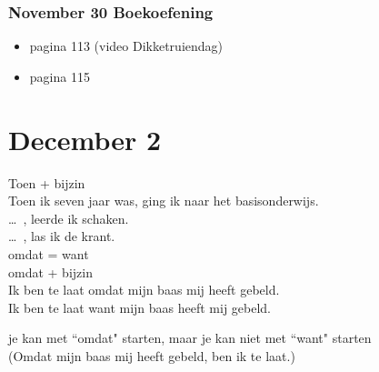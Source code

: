 \documentclass[usenames,dvipsnames]{beamer}
\begin{document}
	\begin{frame}
		\frametitle{November 30 Boekoefening}

		\begin{itemize}
			\item pagina 113 (video Dikketruiendag)
			\item pagina 115
		\end{itemize}

	\end{frame}


	\section{December 2}
	\begin{frame}

		Toen + bijzin \\
		Toen ik seven jaar was, ging ik naar het basisonderwijs.\\
		\hspace{2.85cm} \ldots\ , leerde ik schaken. \\
		\hspace{2.85cm} \ldots\ , las ik de krant. \\

		\hfill \break
		omdat = want \\
		omdat + bijzin \\
		Ik ben te laat omdat mijn baas mij heeft gebeld. \\
		Ik ben te laat want mijn baas heeft mij gebeld. \break

		je kan met ``omdat" starten, maar je kan niet met ``want" starten \\
		(Omdat mijn baas mij heeft gebeld, ben ik te laat.)

	\end{frame}
\end{document}
